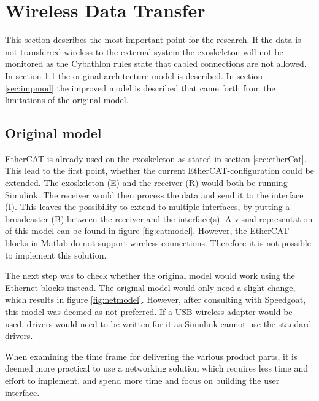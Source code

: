 \section{Wireless Data Transfer}\label{sec:datatrans}
This section describes the most important point for the research. If the data is not transferred wireless to the external system the exoskeleton will not be monitored as the Cybathlon rules state that cabled connections are not allowed. In section \ref{sec:orgmod} the original architecture model is described. In section \ref{sec:impmod} the improved model is described that came forth from the limitations of the original model.

\subsection{Original model} \label{sec:orgmod}
EtherCAT is already used on the exoskeleton as stated in section \ref{sec:etherCat}. This lead to the first point, whether the current EtherCAT-configuration could be extended. The exoskeleton (E) and the receiver (R) would both be running Simulink. The receiver would then process the data and send it to the interface (I). This leaves the possibility to  extend to multiple interfaces, by putting a broadcaster (B) between the receiver and the interface(s). A visual representation of this model can be found in figure \ref{fig:catmodel}. However, the EtherCAT-blocks in Matlab \cite{web:ethercat} do not support wireless connections. Therefore it is not possible to implement this solution.

The next step was to check whether the original model would work using the Ethernet-blocks \cite{web:ethernet} instead. The original model would only need a slight change, which results in figure \ref{fig:netmodel}. However, after consulting with Speedgoat, this model was deemed as not preferred. If a USB wireless adapter would be used, drivers would need to be written for it as Simulink cannot use the standard drivers.

When examining the time frame for delivering the various product parts, it is deemed more practical to use a networking solution which requires less time and effort to implement, and spend more time and focus on building the user interface.

